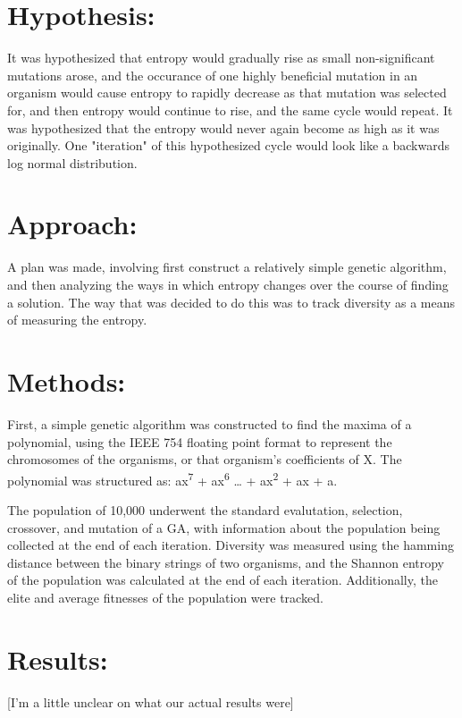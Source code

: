 \documentclass[11pt]{article}
\begin{document}
\section{Hypothesis:}
\label{sec:org26a3be1}
It was hypothesized that entropy would gradually rise as small non-significant mutations arose, and the occurance
of one highly beneficial mutation in an organism would cause entropy to rapidly decrease as that mutation was 
selected for, and then entropy would continue to rise, and the same cycle would repeat. It was hypothesized that 
the entropy would never again become as high as it was originally. One "iteration" of this hypothesized cycle
would look like a backwards log normal distribution.

\section{Approach:}
\label{sec:org8c588e5}
A plan was made, involving first construct a relatively simple genetic algorithm, and then analyzing the ways
in which entropy changes over the course of finding a solution. The way that was decided to do this was
to track diversity as a means of measuring the entropy.

\section{Methods:}
\label{sec:org2c55902}
First, a simple genetic algorithm was constructed to find the maxima of a polynomial, using the IEEE 754
floating point format to represent the chromosomes of the organisms, or that organism's coefficients of
X. The polynomial was structured as: ax\textsuperscript{7} + ax\textsuperscript{6}  \ldots{} + ax\textsuperscript{2} + ax + a.

The population of 10,000 underwent the standard evalutation, selection, crossover, and mutation of a 
GA, with information about the population being collected at the end of each iteration. Diversity was 
measured using the hamming distance between the binary strings of two organisms, and the Shannon entropy
of the population was calculated at the end of each iteration. Additionally, the elite and average fitnesses
of the population were tracked.

\section{Results:}
\label{sec:orged0917a}
[I'm a little unclear on what our actual results were]
\end{document}
